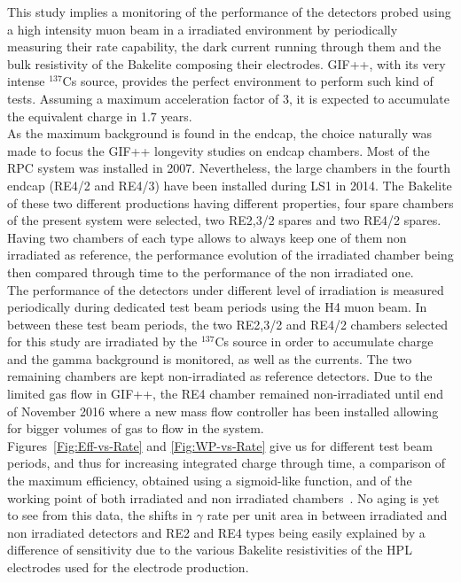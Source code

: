 		
	    This study implies a monitoring of the performance of the detectors probed using a high intensity muon beam in a irradiated environment by periodically measuring their rate capability, the dark current running through them and the bulk resistivity of the Bakelite composing their electrodes. GIF++, with its very intense $^{137}$Cs source, provides the perfect environment to perform such kind of tests. Assuming a maximum acceleration factor of 3, it is expected to accumulate the equivalent charge in 1.7 years.\\
	    As the maximum background is found in the endcap, the choice naturally was made to focus the GIF++ longevity studies on endcap chambers. Most of the RPC system was installed in 2007. Nevertheless, the large chambers in the fourth endcap (RE4/2 and RE4/3) have been installed during LS1 in 2014. The Bakelite of these two different productions having different properties, four spare chambers of the present system were selected, two RE2,3/2 spares and two RE4/2 spares. Having two chambers of each type allows to always keep one of them non irradiated as reference, the performance evolution of the irradiated chamber being then compared through time to the performance of the non irradiated one.\\
	    The performance of the detectors under different level of irradiation is measured periodically during dedicated test beam periods using the H4 muon beam. In between these test beam periods, the two RE2,3/2 and RE4/2 chambers selected for this study are irradiated by the $^{137}$Cs source in order to accumulate charge and the gamma background is monitored, as well as the currents. The two remaining chambers are kept non-irradiated as reference detectors. Due to the limited gas flow in GIF++, the RE4 chamber remained non-irradiated until end of November 2016 where a new mass flow controller has been installed allowing for bigger volumes of gas to flow in the system.\\
	     Figures~\ref{Fig:Eff-vs-Rate} and \ref{Fig:WP-vs-Rate} give us for different test beam periods, and thus for increasing integrated charge through time, a comparison of the maximum efficiency, obtained using a sigmoid-like function, and of the working point of both irradiated and non irradiated chambers~\cite{SIGMOID2005}. No aging is yet to see from this data, the shifts in $\gamma$ rate per unit area  in between irradiated and non irradiated detectors and RE2 and RE4 types being easily explained by a difference of sensitivity due to the various Bakelite resistivities of the HPL electrodes used for the electrode production.\\
